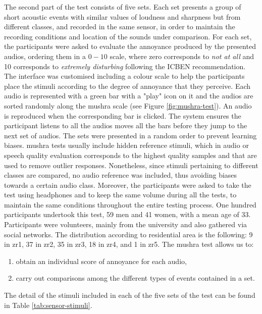 The second part of the test consists of five sets. Each set presents a group of short acoustic events with similar values of loudness and sharpness but from different classes, and recorded in the same sensor, in order to maintain the recording conditions and location of the sounds under comparison. For each set, the participants were asked to evaluate the annoyance produced by the presented audios, ordering them in a $0-10$ scale, where zero corresponds to \emph{not at all} and 10 corresponds to \emph{extremely disturbing} following the ICBEN recommendation. The interface was customised including a colour scale to help the participants place the stimuli according to the degree of annoyance that they perceive. Each audio is represented with a green bar with a "play" icon on it and the audios are sorted randomly along the \gls{mushra} scale (see Figure \ref{fig:mushra-test}). An audio is reproduced when the corresponding bar is clicked. The system ensures the participant listens to all the audios moves all the bars before they jump to the next set of audios. The sets were presented in a random order to prevent learning biases. \gls{mushra} tests usually include hidden reference stimuli, which in audio or speech quality evaluation corresponds to the highest quality samples and that are used to remove outlier responses. Nonetheless, since stimuli pertaining to different classes are compared, no audio reference was included, thus avoiding biases towards a certain audio class. Moreover, the participants were asked to take the test using headphones and to keep the same volume during all the tests, to maintain the same conditions throughout the entire testing process. One hundred participants undertook this test, 59 men and 41 women, with a mean age of 33. Participants were volunteers, mainly from the university and also gathered via social networks. The distribution according to residential area is the following: 9 in zr1, 37 in zr2, 35 in zr3, 18 in zr4, and 1 in zr5. The \gls{mushra} test allows us to:

\begin{enumerate}
  \item obtain an individual score of annoyance for each audio,
  \item carry out comparisons among the different types of events contained in a set.
\end{enumerate}

The detail of the stimuli included in each of the five sets of the test can be found in Table \ref{tab:sensor-stimuli}.

